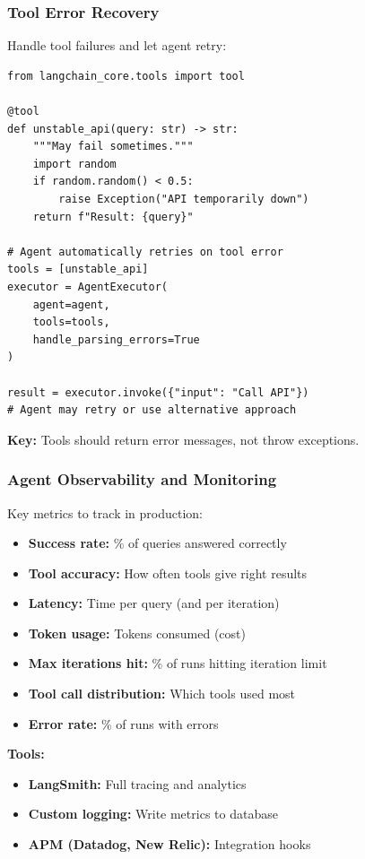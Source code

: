 \documentclass[aspectratio=169,11pt]{beamer}
\begin{document}
\begin{frame}[fragile]
\frametitle{Tool Error Recovery}

Handle tool failures and let agent retry:

\begin{lstlisting}
from langchain_core.tools import tool

@tool
def unstable_api(query: str) -> str:
    """May fail sometimes."""
    import random
    if random.random() < 0.5:
        raise Exception("API temporarily down")
    return f"Result: {query}"

# Agent automatically retries on tool error
tools = [unstable_api]
executor = AgentExecutor(
    agent=agent,
    tools=tools,
    handle_parsing_errors=True
)

result = executor.invoke({"input": "Call API"})
# Agent may retry or use alternative approach
\end{lstlisting}

\textbf{Key:} Tools should return error messages, not throw exceptions.

\end{frame}

\begin{frame}
\frametitle{Agent Observability and Monitoring}

Key metrics to track in production:

\vspace{0.3cm}

\begin{itemize}
  \item \textbf{Success rate:} \% of queries answered correctly
  \item \textbf{Tool accuracy:} How often tools give right results
  \item \textbf{Latency:} Time per query (and per iteration)
  \item \textbf{Token usage:} Tokens consumed (cost)
  \item \textbf{Max iterations hit:} \% of runs hitting iteration limit
  \item \textbf{Tool call distribution:} Which tools used most
  \item \textbf{Error rate:} \% of runs with errors
\end{itemize}

\vspace{0.5cm}

\textbf{Tools:}
\begin{itemize}
  \item \textbf{LangSmith:} Full tracing and analytics
  \item \textbf{Custom logging:} Write metrics to database
  \item \textbf{APM (Datadog, New Relic):} Integration hooks
\end{itemize}

\end{frame}
\end{document}

